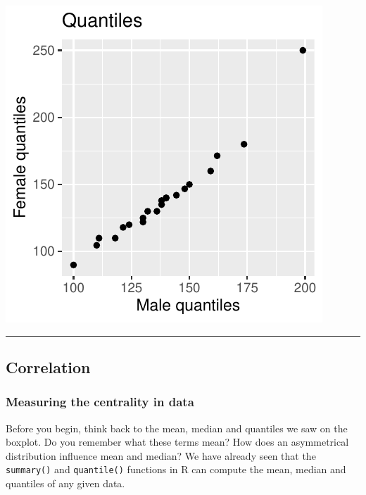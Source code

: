 \documentclass[
]{book}
\newenvironment{Shaded}{\begin{snugshade}}{\end{snugshade}}
\newcommand{\FunctionTok}[1]{\textcolor[rgb]{0.13,0.29,0.53}{\textbf{#1}}}
\newcommand{\NormalTok}[1]{#1}
\newcommand{\SpecialCharTok}[1]{\textcolor[rgb]{0.81,0.36,0.00}{\textbf{#1}}}
\begin{document}
\includegraphics{_main_files/figure-latex/unnamed-chunk-53-1.pdf}

\begin{center}\rule{0.5\linewidth}{0.5pt}\end{center}

\hypertarget{correlation}{%
\subsection{Correlation}\label{correlation}}

\hypertarget{measuring-the-centrality-in-data}{%
\subsubsection{Measuring the centrality in data}\label{measuring-the-centrality-in-data}}

Before you begin, think back to the mean, median and quantiles we saw on the boxplot. Do you remember what these terms mean? How does an asymmetrical distribution influence mean and median?
We have already seen that the \texttt{summary()} and \texttt{quantile()} functions in R can compute the mean, median and quantiles of any given data.

\begin{Shaded}
\end{Shaded}
\end{document}
